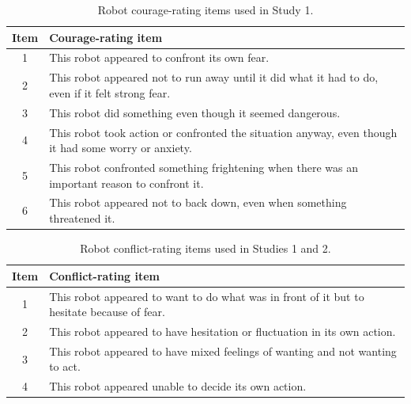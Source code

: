 \documentclass[utf8]{FrontiersinHarvard}
\begin{document}
\begin{table}[htbp]
\centering
\small
\caption{Robot courage-rating items used in Study 1.}
\label{tab:courage_items}
\begin{tabularx}{\linewidth}{c >{\raggedright\arraybackslash}X}
\toprule
\textbf{Item} & \textbf{Courage-rating item} \\
\midrule
1 & This robot appeared to confront its own fear. \\
\midrule
2 & This robot appeared not to run away until it did what it had to do, even if it felt strong fear. \\
\midrule
3 & This robot did something even though it seemed dangerous. \\
\midrule
4 & This robot took action or confronted the situation anyway, even though it had some worry or anxiety. \\
\midrule
5 & This robot confronted something frightening when there was an important reason to confront it. \\
\midrule
6 & This robot appeared not to back down, even when something threatened it. \\
\bottomrule
\end{tabularx}
\end{table}

\vspace{1em}

\begin{table}[htbp]
\centering
\small
\caption{Robot conflict-rating items used in Studies 1 and 2.}
\label{tab:conflict_items}
\begin{tabularx}{\linewidth}{c >{\raggedright\arraybackslash}X}
\toprule
\textbf{Item} & \textbf{Conflict-rating item} \\
\midrule
1 & This robot appeared to want to do what was in front of it but to hesitate because of fear. \\
\midrule
2 & This robot appeared to have hesitation or fluctuation in its own action. \\
\midrule
3 & This robot appeared to have mixed feelings of wanting and not wanting to act. \\
\midrule
4 & This robot appeared unable to decide its own action. \\
\bottomrule
\end{tabularx}
\end{table}

\vspace{1em}
\end{document}
